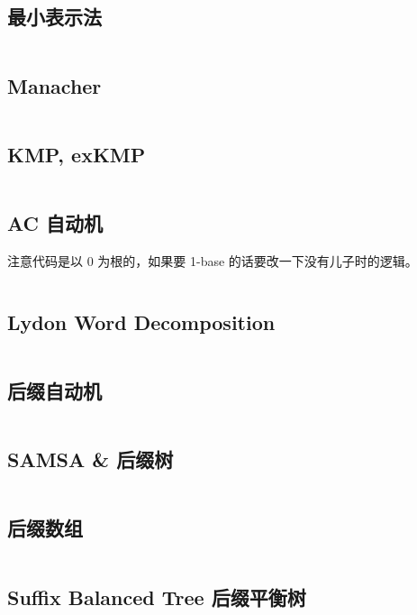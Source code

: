 \documentclass[titlepage, a4paper, 11pt]{article}
\begin{document}
\begin{spacing}{1.15}
				\subsection{最小表示法}
					\inputminted{cpp}{src/String/最小表示法.cpp}
				\subsection{Manacher}
					\inputminted{cpp}{src/String/Manacher.cpp}
				\subsection{KMP, exKMP}
					\inputminted{cpp}{src/String/KMP.cpp}
				\subsection{AC 自动机}
					注意代码是以 0 为根的，如果要 1-base 的话要改一下没有儿子时的逻辑。
					\inputminted{cpp}{src/String/AC 自动机.cpp}
				\subsection{Lydon Word Decomposition}
					\inputminted{cpp}{src/String/Lyndon Word.cpp}
				\subsection{后缀自动机}
					\inputminted{cpp}{src/String/SAM.cpp}
				\subsection{SAMSA \& 后缀树}
					\inputminted{cpp}{src/String/SAMSA.cpp}
				\subsection{后缀数组}
					\inputminted{cpp}{src/String/SA.cpp}
				\subsection{Suffix Balanced Tree 后缀平衡树}
					\inputminted{cpp}{src/String/后缀平衡树.cpp}

\end{spacing}
\end{document}
